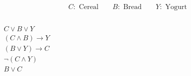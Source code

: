 \begin{frame}{}
  \[
    C: \text{ Cereal} \qquad B: \text{ Bread} \qquad Y: \text{ Yogurt}
  \]

  \pause
  \begin{columns}
      \begin{gather}
	C \lor B \lor Y \\
	(C \land B) \to Y \\
	(B \lor Y) \to C \\
	\lnot (C \land Y) \\
	B \lor C
      \end{gather}
  \end{columns}

  \pause
  \vspace{0.80cm}
  \begin{quote}
    \centerline{}
  \end{quote}
\end{frame}

\begin{frame}{}
\end{frame}
